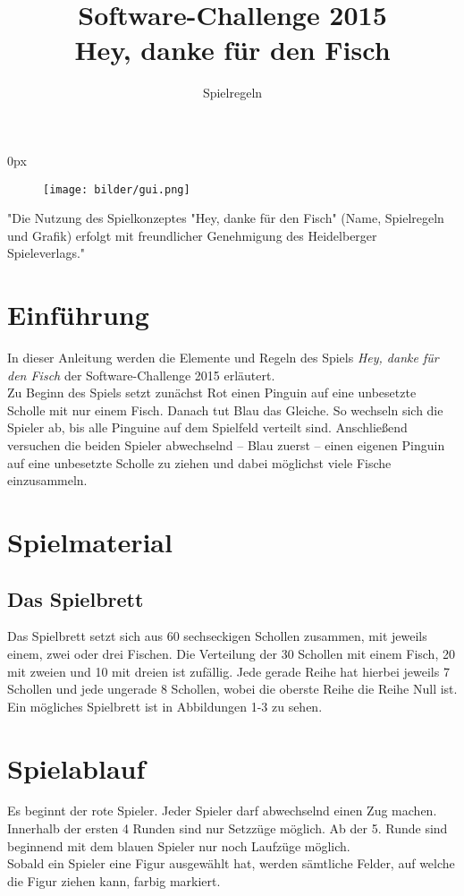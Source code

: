 \documentclass[a4paper, ngerman]{scrartcl}
\title{Software-Challenge 2015 \\ Hey, danke für den Fisch}
\subtitle{Spielregeln}
\begin{document}
\parindent0px
\maketitle

\begin{figure}[h!]
	\centering
	\texttt{[image: bilder/gui.png]} 
\end{figure}
\vspace*{\fill}
"Die Nutzung des Spielkonzeptes "Hey, danke für den Fisch" (Name, Spielregeln
und Grafik) erfolgt mit freundlicher Genehmigung des Heidelberger
Spieleverlags."
\newpage
\tableofcontents
\newpage

\section{Einführung}
In dieser Anleitung werden die Elemente und Regeln des Spiels \emph{Hey, danke
für den Fisch} der Software-Challenge 2015 erläutert.\\
Zu Beginn des Spiels setzt zunächst Rot einen Pinguin auf eine unbesetzte Scholle mit nur einem Fisch. Danach tut Blau das Gleiche. So wechseln sich die Spieler ab, bis alle Pinguine auf dem Spielfeld verteilt sind.
Anschließend versuchen die beiden Spieler abwechselnd – Blau zuerst – einen eigenen Pinguin auf eine unbesetzte Scholle zu ziehen und dabei möglichst viele Fische einzusammeln.

\section{Spielmaterial}
	\subsection{Das Spielbrett}
Das Spielbrett setzt sich aus 60 sechseckigen Schollen zusammen,
mit jeweils einem, zwei oder drei Fischen.
Die Verteilung der 30 Schollen mit einem Fisch, 20 mit zweien und 10 mit
dreien ist zufällig.
Jede gerade Reihe hat hierbei jeweils 7 Schollen und jede ungerade 8
Schollen, wobei die oberste Reihe die Reihe Null ist. Ein mögliches
Spielbrett ist in Abbildungen 1-3 zu sehen.
\section{Spielablauf}	 

	Es beginnt der rote Spieler. Jeder Spieler darf abwechselnd einen
	Zug machen. Innerhalb der ersten 4 Runden sind nur Setzzüge möglich. Ab der
	5.
	Runde sind beginnend mit dem blauen Spieler nur noch Laufzüge möglich.\\
	Sobald ein Spieler eine Figur ausgewählt hat, werden sämtliche Felder, auf
	welche die Figur ziehen kann, farbig markiert.
	 
\end{document}
